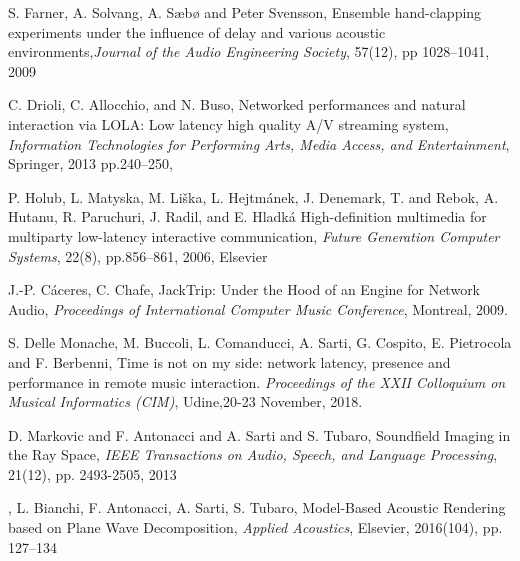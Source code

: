 S. Farner, A. Solvang, A. Sæbø and Peter Svensson, Ensemble hand-clapping experiments under
the influence of delay and various acoustic
environments,\emph{Journal of the Audio Engineering Society}, 57(12),
  pp 1028--1041, 2009


C. Drioli, C. Allocchio, and N. Buso,
  Networked performances and natural interaction via LOLA: Low latency high quality A/V streaming system,
  \emph{Information Technologies for Performing Arts, Media Access, and Entertainment}, Springer, 2013
  pp.240--250,

P. Holub, L. Matyska, M. Li{\v{s}}ka, L. Hejtm{\'a}nek, J. Denemark, T. and Rebok, A. Hutanu, R. Paruchuri, J. Radil, and E. Hladk{\'a}
  High-definition multimedia for multiparty low-latency interactive communication,
  \emph{Future Generation Computer Systems},
 22(8),
  pp.856--861,
 2006,
Elsevier

J.-P. C\'{a}ceres, C. Chafe, JackTrip: Under the Hood of an Engine for Network Audio, \emph{Proceedings of International Computer Music Conference}, Montreal, 2009. 

S. Delle Monache, M. Buccoli, L. Comanducci, A. Sarti, G. Cospito, E. Pietrocola and F. Berbenni, Time is not on my side: network latency, presence and performance in remote music interaction. \emph{Proceedings of the XXII Colloquium on Musical Informatics (CIM)}, Udine,20-23 November, 2018.

D. Markovic and F. Antonacci and A. Sarti and S. Tubaro, Soundfield Imaging in the Ray Space, 
\emph{IEEE Transactions on Audio, Speech, and Language Processing}, 
21(12), 
pp. 2493-2505, 2013

,
L. Bianchi, F. Antonacci, A. Sarti, S. Tubaro,
Model-Based Acoustic Rendering based on Plane Wave Decomposition,
\emph{Applied Acoustics},
Elsevier,
2016(104),
pp. 127--134





%	
%	
%	
%	
%	
%	
%	